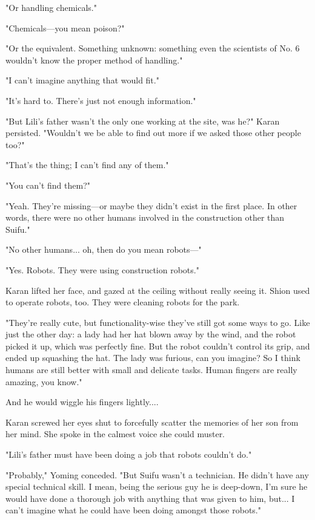 "Or handling chemicals."

"Chemicals---you mean poison?"

"Or the equivalent. Something unknown: something even the scientists of
No. 6 wouldn't know the proper method of handling."

"I can't imagine anything that would fit."

"It's hard to. There's just not enough information."

"But Lili's father wasn't the only one working at the site, was he?"
Karan persisted. "Wouldn't we be able to find out more if we asked those
other people too?"

"That's the thing; I can't find any of them."

"You can't find them?"

"Yeah. They're missing---or maybe they didn't exist in the first place. In
other words, there were no other humans involved in the construction
other than Suifu."

"No other humans... oh, then do you mean robots---"

"Yes. Robots. They were using construction robots."

Karan lifted her face, and gazed at the ceiling without really seeing
it. Shion used to operate robots, too. They were cleaning robots for the
park.

"They're really cute, but functionality-wise they've still got some ways
to go. Like just the other day: a lady had her hat blown away by the
wind, and the robot picked it up, which was perfectly fine. But the
robot couldn't control its grip, and ended up squashing the hat. The
lady was furious, can you imagine? So I think humans are still better
with small and delicate tasks. Human fingers are really amazing, you
know."

And he would wiggle his fingers lightly....

Karan screwed her eyes shut to forcefully scatter the memories of her
son from her mind. She spoke in the calmest voice she could muster.

"Lili's father must have been doing a job that robots couldn't do."

"Probably," Yoming conceded. "But Suifu wasn't a technician. He didn't
have any special technical skill. I mean, being the serious guy he is
deep-down, I'm sure he would have done a thorough job with anything that
was given to him, but... I can't imagine what he could have been doing
amongst those robots."

